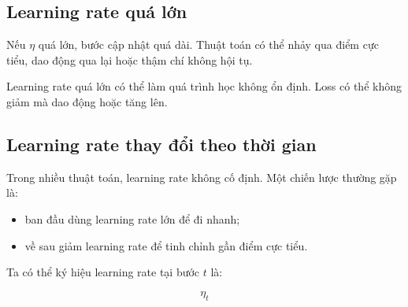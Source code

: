 \subsection{Learning rate quá lớn}

Nếu $\eta$ quá lớn, bước cập nhật quá dài. Thuật toán có thể nhảy qua điểm cực tiểu, dao động qua lại hoặc thậm chí không hội tụ.

\begin{center}
\end{center}

\begin{canhbao}
Learning rate quá lớn có thể làm quá trình học không ổn định. Loss có thể không giảm mà dao động hoặc tăng lên.
\end{canhbao}

\subsection{Learning rate thay đổi theo thời gian}

Trong nhiều thuật toán, learning rate không cố định. Một chiến lược thường gặp là:

\begin{itemize}
    \item ban đầu dùng learning rate lớn để đi nhanh;
    \item về sau giảm learning rate để tinh chỉnh gần điểm cực tiểu.
\end{itemize}

Ta có thể ký hiệu learning rate tại bước $t$ là:

\[
    \eta_t
\]

